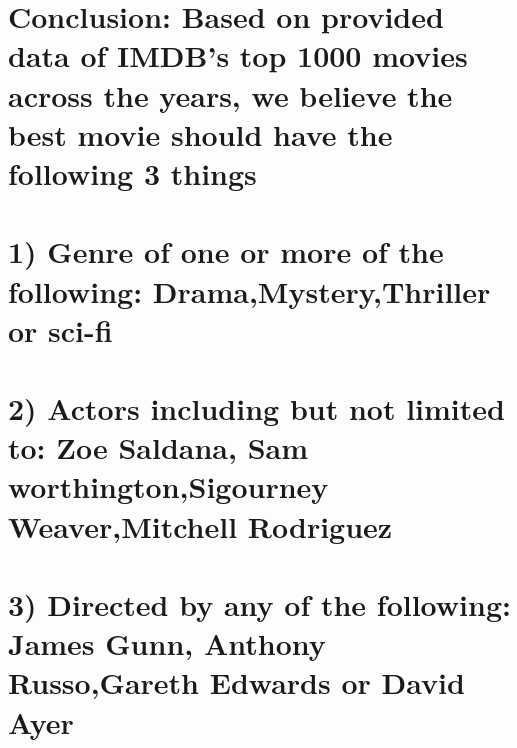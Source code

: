 \documentclass[11pt]{article}
\begin{document}
    \section{Conclusion: Based on provided data of IMDB's top 1000 movies
across the years, we believe the best movie should have the following 3
things}\label{conclusion-based-on-provided-data-of-imdbs-top-1000-movies-across-the-years-we-believe-the-best-movie-should-have-the-following-3-things}

\section{1) Genre of one or more of the following:
Drama,Mystery,Thriller or
sci-fi}\label{genre-of-one-or-more-of-the-following-dramamysterythriller-or-sci-fi}

\section{2) Actors including but not limited to: Zoe Saldana, Sam
worthington,Sigourney Weaver,Mitchell
Rodriguez}\label{actors-including-but-not-limited-to-zoe-saldana-sam-worthingtonsigourney-weavermitchell-rodriguez}

\section{3) Directed by any of the following: James Gunn, Anthony
Russo,Gareth Edwards or David
Ayer}\label{directed-by-any-of-the-following-james-gunn-anthony-russogareth-edwards-or-david-ayer}


    
    
    
    
\end{document}
